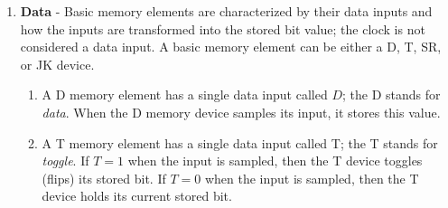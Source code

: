 \begin{changemargin}{1.5cm}{1.5cm}
\begin{enumerate}
        \item \textbf{ Data} - Basic memory elements are characterized by
            their data inputs and how the inputs are transformed into the
            stored bit value; the clock is not considered a data input.
            A basic memory element can be either a D, T, SR, or JK device.

            \begin{enumerate}

                \item
                    A D memory element has a single data input called $D$;
                    the D stands for \textit{ data}.  When the
                    D memory device samples its input, it stores this value.

                \item
                    A T memory element has a single data input called T;
                    the T stands for \textit{ toggle}.  If $T=1$ when the input
                    is sampled, then the T device toggles (flips) its stored bit.
                    If $T=0$ when the input is sampled, then the T device holds its
                    current stored bit.


\end{enumerate}
\end{enumerate}
\end{changemargin}
